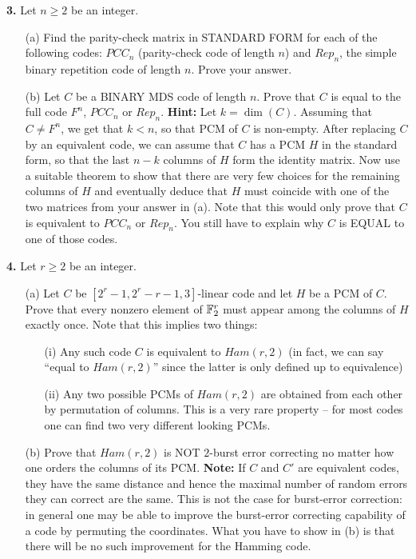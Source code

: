 \documentclass[12pt]{amsart}
\begin{document}
{\bf 3.} Let $n\geq 2$ be an integer.
\begin{itemize}
\item[(a)] Find the parity-check matrix in STANDARD FORM for each of the following codes: $PCC_n$ (parity-check code of length $n$)
and $Rep_n$, the simple binary repetition code of length $n$. Prove your answer.
\item[(b)] Let $C$ be a BINARY MDS code of length $n$. Prove that $C$ is equal to the full code $F^n$, $PCC_n$ or $Rep_n$.
{\bf Hint:} Let $k=\dim(C)$. Assuming that $C\neq F^n$, we get that $k<n$, so that PCM of $C$ is non-empty. After replacing 
$C$ by an equivalent code, we can assume that $C$ has a PCM $H$ in the standard form, so that the last $n-k$ columns of $H$
form the identity matrix. Now use a suitable theorem to show that there are very few choices for the remaining columns of $H$
and eventually deduce that $H$ must coincide with one of the two matrices from your answer in (a). Note that this would only prove that $C$ is equivalent to $PCC_n$ or $Rep_n$. You still have to explain why $C$ is EQUAL to one of those codes.
\end{itemize}
\skv
{\bf 4.} Let $r\geq 2$ be an integer.
\begin{itemize}
\item[(a)] Let $C$ be $[2^r-1,2^r-r-1,3]$-linear code and let $H$ be a PCM of $C$. Prove that every nonzero element of ${\mathbb F}_2^r$ must appear among the columns of $H$ exactly once. Note that this implies two things:
\begin{itemize}
\item[(i)] Any such code $C$ is equivalent to $Ham(r,2)$ (in fact, we can say ``equal to $Ham(r,2)$'' since the latter is only defined up to equivalence)
\item[(ii)] Any two possible PCMs of $Ham(r,2)$ are obtained from each other by permutation of columns. This is a very rare property -- for most codes one can find two very different looking PCMs. 
\end{itemize}
\item[(b)] Prove that $Ham(r,2)$ is NOT $2$-burst error correcting no matter how one orders the columns of its PCM. {\bf Note:}
If $C$ and $C'$ are equivalent codes, they have the same distance and hence the maximal number of random errors they can correct are the same. This is not the case for burst-error correction: in general one may be able to improve the burst-error correcting capability of a code by permuting the coordinates. What you have to show in (b) is that there will be no such improvement for the Hamming code.
\end{itemize}
\end{document}
